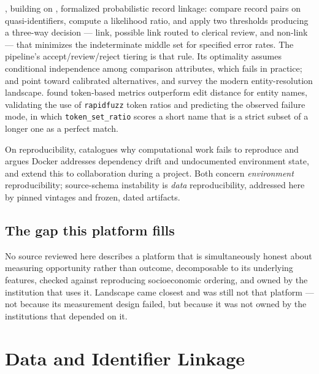 \documentclass[12pt]{article}
\begin{document}
\citet{fellegi1969}, building on \citet{newcombe1959}, formalized probabilistic record linkage: compare record pairs on quasi-identifiers, compute a likelihood ratio, and apply two thresholds producing a three-way decision --- link, possible link routed to clerical review, and non-link --- that minimizes the indeterminate middle set for specified error rates. The pipeline's accept/review/reject tiering is that rule. Its optimality assumes conditional independence among comparison attributes, which fails in practice; \citet{enamorado2019} and \citet{christen2012} point toward calibrated alternatives, and \citet{binette2022} survey the modern entity-resolution landscape. \citet{cohen2003} found token-based metrics outperform edit distance for entity names, validating the use of \texttt{rapidfuzz} token ratios \citep{rapidfuzz} and predicting the observed failure mode, in which \texttt{token\_set\_ratio} scores a short name that is a strict subset of a longer one as a perfect match.

On reproducibility, \citet{boettiger2015} catalogues why computational work fails to reproduce and argues Docker addresses dependency drift and undocumented environment state, and \citet{wiebels2021} extend this to collaboration during a project. Both concern \emph{environment} reproducibility; source-schema instability is \emph{data} reproducibility, addressed here by pinned vintages and frozen, dated artifacts.

\subsection{The gap this platform fills}
\label{sec:the-gap}

No source reviewed here describes a platform that is simultaneously honest about measuring opportunity rather than outcome, decomposable to its underlying features, checked against reproducing socioeconomic ordering, and owned by the institution that uses it. Landscape came closest and was still not that platform --- not because its measurement design failed, but because it was not owned by the institutions that depended on it.

\section{Data and Identifier Linkage}
\label{sec:data}
\end{document}
